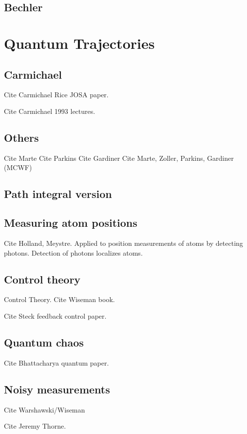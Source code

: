 \subsection{Bechler}

\cite{Bechler1999}
\cite{Bechler2006}




\section{Quantum Trajectories}

\subsection{Carmichael}
Cite Carmichael Rice JOSA paper.

Cite Carmichael 1993 lectures. \cite{Carmichael1993}

\subsection{Others}

Cite Marte
Cite Parkins  
Cite Gardiner \cite{Gardiner1992}
Cite Marte, Zoller, Parkins, Gardiner (MCWF) \cite{Dalibard1992}
\cite{Dum1992}

\subsection{Path integral version}


\subsection{Measuring atom positions}

 Cite Holland, Meystre.  Applied to position measurements of atoms by detecting photons.  Detection of photons localizes atoms.  
\cite{Holland1996}


\subsection{Control theory}
 Control Theory.  Cite Wiseman book.   \cite{WisemanMilburn2010}
 
Cite Steck feedback control paper.  \cite{Steck2004, Steck2006}

\subsection{Quantum chaos}

Cite Bhattacharya quantum paper.  \cite{Bhattacharya2005}

\subsection{Noisy measurements}
Cite Warshawski/Wiseman \cite{Warszawski2003}

Cite Jeremy Thorne.  


